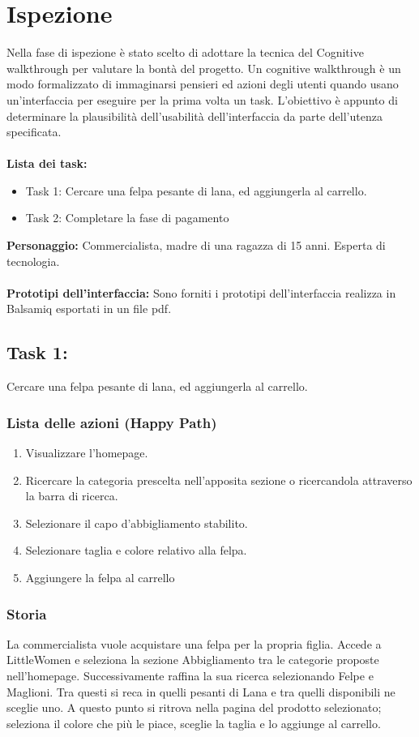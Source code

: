 \documentclass[12pt,a4paper]{report}
\begin{document}
\section{Ispezione}
Nella fase di ispezione è stato scelto di adottare la tecnica del Cognitive walkthrough per valutare la bontà del progetto. Un cognitive walkthrough è un modo formalizzato di immaginarsi pensieri ed azioni degli utenti quando usano un'interfaccia per eseguire per la prima volta un task. L'obiettivo è appunto di determinare la plausibilità dell'usabilità dell'interfaccia da parte dell'utenza specificata.\\\\
\textbf{Lista dei task:}
\begin{itemize}
  \item Task 1: Cercare una felpa pesante di lana, ed aggiungerla al carrello.
  \item Task 2: Completare la fase di pagamento
\end{itemize}
\textbf{Personaggio:} Commercialista, madre di una ragazza di 15 anni. Esperta di tecnologia.\\\\
\textbf{Prototipi dell'interfaccia:} Sono forniti i prototipi dell'interfaccia realizza in Balsamiq esportati in un file pdf. \\
\subsection*{Task 1:} Cercare una felpa pesante di lana, ed aggiungerla al carrello.
\subsubsection{Lista delle azioni (Happy Path)}
\begin{enumerate}
  \item Visualizzare l'homepage.
  \item Ricercare la categoria prescelta nell'apposita sezione o ricercandola attraverso la barra di ricerca.
  \item Selezionare il capo d'abbigliamento stabilito.
  \item Selezionare taglia e colore relativo alla felpa.
  \item Aggiungere la felpa al carrello
\end{enumerate}
\subsubsection{Storia}
La commercialista vuole acquistare una felpa per la propria figlia. Accede a LittleWomen e seleziona la sezione Abbigliamento tra le categorie proposte nell'homepage. Successivamente raffina la sua ricerca selezionando Felpe e Maglioni. Tra questi si reca in quelli pesanti di Lana e tra quelli disponibili ne sceglie uno. A questo punto si ritrova nella pagina del prodotto selezionato; seleziona il colore che più le piace, sceglie la taglia e lo aggiunge al carrello.
\newpage
\end{document}
